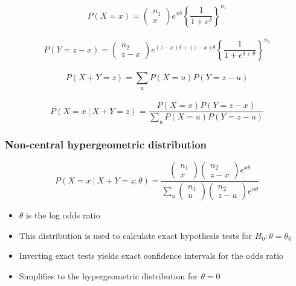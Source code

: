 \documentclass[aspectratio=169]{beamer}
\begin{document}
\begin{frame}
$$
P(X = x) = \left(\begin{array}{c} n_1 \\ x \end{array}\right)e^{x\delta}
\left\{\frac{1}{1 + e^\delta}\right\}^{n_1}
$$ \ \\
$$
P(Y = z-x) =  \left(\begin{array}{c} n_2 \\ z-x \end{array}\right)e^{(z-x)\delta + (z-x)\theta}
\left\{\frac{1}{1 + e^{\delta+\theta}}\right\}^{n_2}
$$\ \\ 
$$
P(X+Y = z) = \sum_u P(X = u)P(Y = z - u)
$$ \ \\
$$
P(X = x ~|~ X+Y = z) = \frac{P(X = x)P(Y = z - x)}{\sum_u P(X = u) P(Y = z-u)}
$$
\end{frame}

\begin{frame}\frametitle{Non-central hypergeometric distribution}
$$
P(X = x ~|~ X+Y = z; \theta)
= \frac{
\left(\begin{array}{c} n_1 \\ x \end{array}\right)
\left(\begin{array}{c} n_2 \\ z-x \end{array}\right) e^{x\theta}
}{
\sum_u 
\left(\begin{array}{c} n_1 \\ u \end{array}\right)
\left(\begin{array}{c} n_2 \\ z-u \end{array}\right) e^{u\theta}
}
$$
\begin{itemize}
\item $\theta$ is the log odds ratio 
\item This distribution is used to calculate exact hypothesis tests for
  $H_0:\theta = \theta_0$
\item Inverting exact tests yields exact confidence intervals for the odds
  ratio
\item Simplifies to the hypergeometric distribution for $\theta = 0$
\end{itemize} 
\end{frame}
\end{document}
